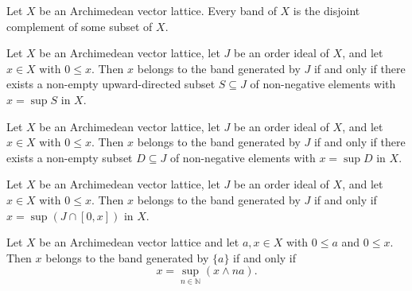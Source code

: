 \begin{theorem}
\label{thm:band-exists-eq-disjointComplement}
\leanok
{}
Let $X$ be an Archimedean vector lattice. Every band of $X$ is the
disjoint complement of some subset of $X$.
\end{theorem}

\begin{theorem}
\label{thm:band-mem-generated-orderIdeal-iff-isLUB-directed}
\leanok
{}
Let $X$ be an Archimedean vector lattice, let $J$ be an order ideal of
$X$, and let $x \in X$ with $0 \le x$. Then $x$ belongs to the band
generated by $J$ if and only if there exists a non-empty
upward-directed subset $S \subseteq J$ of non-negative elements with
$x = \sup S$ in $X$.
\end{theorem}

\begin{theorem}
\label{thm:band-mem-generated-orderIdeal-iff-isLUB-nonneg}
\leanok
{}
Let $X$ be an Archimedean vector lattice, let $J$ be an order ideal of
$X$, and let $x \in X$ with $0 \le x$. Then $x$ belongs to the band
generated by $J$ if and only if there exists a non-empty subset
$D \subseteq J$ of non-negative elements with $x = \sup D$ in $X$.
\end{theorem}

\begin{theorem}
\label{thm:band-mem-generated-orderIdeal-iff-isLUB-inter}
\leanok
{}
Let $X$ be an Archimedean vector lattice, let $J$ be an order ideal of
$X$, and let $x \in X$ with $0 \le x$. Then $x$ belongs to the band
generated by $J$ if and only if $x = \sup (J \cap [0, x])$ in $X$.
\end{theorem}

\begin{theorem}
\label{thm:band-mem-generated-singleton-iff-isLUB-inf-nsmul}
\leanok
{}
Let $X$ be an Archimedean vector lattice and let $a, x \in X$ with
$0 \le a$ and $0 \le x$. Then $x$ belongs to the band generated by
$\{a\}$ if and only if
\[
  x = \sup_{n \in \mathbb{N}} (x \wedge n a).
\]
\end{theorem}

